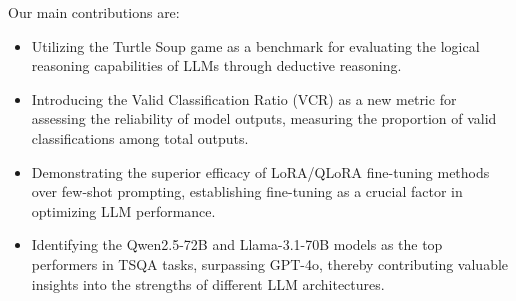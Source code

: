 Our main contributions are:
\begin{itemize}
    \item Utilizing the Turtle Soup game as a benchmark for evaluating the logical reasoning capabilities of LLMs through deductive reasoning.
    
    \item Introducing the Valid Classification Ratio (VCR) as a new metric for assessing the reliability of model outputs, measuring the proportion of valid classifications among total outputs.

    \item Demonstrating the superior efficacy of LoRA/QLoRA fine-tuning methods over few-shot prompting, establishing fine-tuning as a crucial factor in optimizing LLM performance.

    \item Identifying the Qwen2.5-72B and Llama-3.1-70B models as the top performers in TSQA tasks, surpassing GPT-4o, thereby contributing valuable insights into the strengths of different LLM architectures.
\end{itemize}



 


